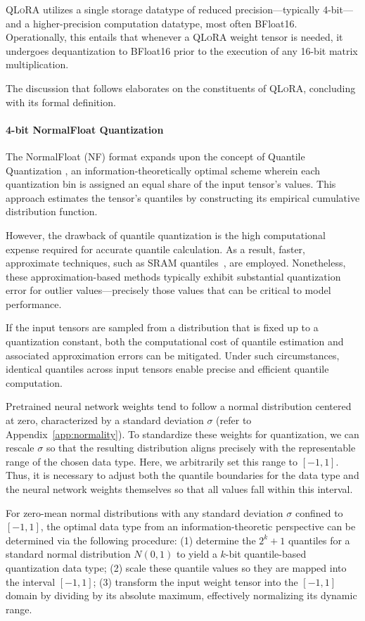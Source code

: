 \textsc{QLoRA} utilizes a single storage datatype of reduced precision—typically 4-bit—and a higher-precision computation datatype, most often BFloat16. Operationally, this entails that whenever a \textsc{QLoRA} weight tensor is needed, it undergoes dequantization to BFloat16 prior to the execution of any 16-bit matrix multiplication.

The discussion that follows elaborates on the constituents of \textsc{QLoRA}, concluding with its formal definition.

\paragraph{4-bit NormalFloat Quantization} The NormalFloat (NF) format expands upon the concept of Quantile Quantization \citep{dettmers2022optimizers}, an information-theoretically optimal scheme wherein each quantization bin is assigned an equal share of the input tensor’s values. This approach estimates the tensor's quantiles by constructing its empirical cumulative distribution function.

However, the drawback of quantile quantization is the high computational expense required for accurate quantile calculation. As a result, faster, approximate techniques, such as SRAM quantiles~\citep{dettmers2022optimizers}, are employed. Nonetheless, these approximation-based methods typically exhibit substantial quantization error for outlier values—precisely those values that can be critical to model performance.

If the input tensors are sampled from a distribution that is fixed up to a quantization constant, both the computational cost of quantile estimation and associated approximation errors can be mitigated. Under such circumstances, identical quantiles across input tensors enable precise and efficient quantile computation.

Pretrained neural network weights tend to follow a normal distribution centered at zero, characterized by a standard deviation $\sigma$ (refer to Appendix~\ref{app:normality}). To standardize these weights for quantization, we can rescale $\sigma$ so that the resulting distribution aligns precisely with the representable range of the chosen data type. Here, we arbitrarily set this range to $[-1, 1]$. Thus, it is necessary to adjust both the quantile boundaries for the data type and the neural network weights themselves so that all values fall within this interval.

For zero-mean normal distributions with any standard deviation $\sigma$ confined to $[-1, 1]$, the optimal data type from an information-theoretic perspective can be determined via the following procedure: (1) determine the $2^k+1$ quantiles for a standard normal distribution $N(0, 1)$ to yield a $k$-bit quantile-based quantization data type; (2) scale these quantile values so they are mapped into the interval $[-1, 1]$; (3) transform the input weight tensor into the $[-1, 1]$ domain by dividing by its absolute maximum, effectively normalizing its dynamic range.

